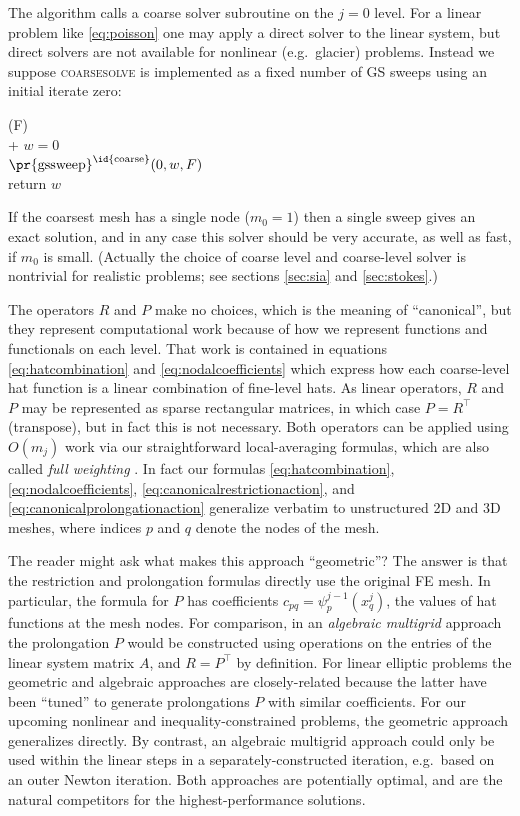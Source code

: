 \documentclass[letterpaper,final,12pt,reqno]{amsart}
\theoremstyle{claim}
\numberwithin{equation}{section}
\numberwithin{figure}{section}
\numberwithin{table}{section}
\begin{document}
The algorithm calls a coarse solver subroutine on the $j=0$ level.  For a linear problem like \eqref{eq:poisson} one may apply a direct solver to the linear system, but direct solvers are not available for nonlinear (e.g.~glacier) problems.  Instead we suppose \textsc{coarsesolve} is implemented as a fixed number of GS sweeps using an initial iterate zero:
\begin{pseudo*}
(F)\text{:} \\+
    $w=0$ \\
    $\text{\pr{gssweep}}^{\text{\id{coarse}}}(0,w,F)$ \\
    return $w$
\end{pseudo*}
If the coarsest mesh has a single node ($m_0=1$) then a single sweep gives an exact solution, and in any case this solver should be very accurate, as well as fast, if $m_0$ is small.  (Actually the choice of coarse level and coarse-level solver is nontrivial for realistic problems; see sections \ref{sec:sia} and \ref{sec:stokes}.)

The operators $R$ and $P$ make no choices, which is the meaning of ``canonical'', but they represent computational work because of how we represent functions and functionals on each level.  That work is contained in equations \eqref{eq:hatcombination} and \eqref{eq:nodalcoefficients} which express how each coarse-level hat function is a linear combination of fine-level hats.  As linear operators, $R$ and $P$ may be represented as sparse rectangular matrices, in which case $P=R^\top$ (transpose), but in fact this is not necessary.  Both operators can be applied using $O(m_j)$ work via our straightforward local-averaging formulas, which are also called \emph{full weighting} \cite{Briggsetal2000}.  In fact our formulas \eqref{eq:hatcombination}, \eqref{eq:nodalcoefficients}, \eqref{eq:canonicalrestrictionaction}, and \eqref{eq:canonicalprolongationaction} generalize verbatim to unstructured 2D and 3D meshes, where indices $p$ and $q$ denote the nodes of the mesh.

The reader might ask what makes this approach ``geometric''?  The answer is that the restriction and prolongation formulas directly use the original FE mesh.  In particular, the formula for $P$ has coefficients $c_{pq} = \psi_p^{j-1}(x_q^j)$, the values of hat functions at the mesh nodes.  For comparison, in an \emph{algebraic multigrid} \cite{Trottenbergetal2001} approach the prolongation $P$ would be constructed using operations on the entries of the linear system matrix $A$, and $R=P^\top$ by definition.  For linear elliptic problems the geometric and algebraic approaches are closely-related because the latter have been ``tuned'' to generate prolongations $P$ with similar coefficients.  For our upcoming nonlinear and inequality-constrained problems, the geometric approach generalizes directly.  By contrast, an algebraic multigrid approach could only be used within the linear steps in a separately-constructed iteration, e.g.~based on an outer Newton iteration.  Both approaches are potentially optimal, and are the natural competitors for the highest-performance solutions.
\end{document}
